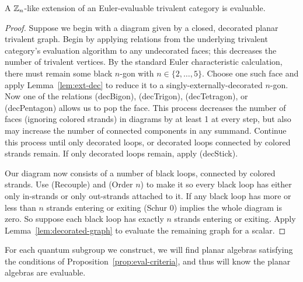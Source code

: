 \begin{proposition}\label{prop:eval-criteria}
    A $\mathbb{Z}_n$-like extension of an Euler-evaluable trivalent category is evaluable.
\end{proposition}

\begin{proof}
    Suppose we begin with a diagram given by a closed, decorated planar trivalent graph.
    Begin by applying relations from the underlying trivalent category's evaluation algorithm to any undecorated faces; 
    this decreases the number of trivalent vertices.
    By the standard Euler characteristic calculation, there must remain some black $n$-gon with $n\in\{ 2,\dots,5 \}$.
    Choose one such face and apply Lemma~\ref{lem:ext-dec} to reduce it to a singly-externally-decorated $n$-gon.
    Now one of the relations (decBigon), (decTrigon), (decTetragon), or (decPentagon) allows us to pop the face.
    This process decreases the number of faces (ignoring colored strands) in diagrams by at least 1 at every step,
    but also may increase the number of connected components in any summand.
    Continue this process until only decorated loops, or decorated loops connected by colored strands remain.
    If only decorated loops remain, apply (decStick).
    
    Our diagram now consists of a number of black loops, connected by colored strands.
    Use (Recouple) and (Order $n$) to make it so every black loop has either only in-strands or only out-strands attached to it.
    If any black loop has more or less than $n$ strands entering or exiting (Schur 0) implies the whole diagram is zero.
    So suppose each black loop has exactly $n$ strands entering or exiting.
    Apply Lemma~\ref{lem:decorated-graph} to evaluate the remaining graph for a scalar.
\end{proof}

For each quantum subgroup we construct, we will find planar algebras satisfying the conditions of Proposition~\ref{prop:eval-criteria}, and thus will know the planar algebras are evaluable. 



